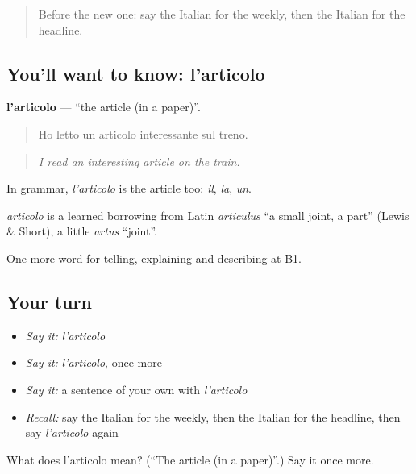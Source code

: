 \label{lesson:IT-C282-articolo}



\begin{quote}
Before the new one: say the Italian for the weekly, then the Italian for the headline.
\end{quote}

\subsection*{You'll want to know: l'articolo}
\textbf{l'articolo} — \textquotedblleft{}the article (in a paper)\textquotedblright{}.

\begin{quote}
Ho letto un articolo interessante sul treno.
\end{quote}

\begin{quote}
\emph{I read an interesting article on the train.}
\end{quote}

In grammar, \emph{l'articolo} is the article too: \emph{il}, \emph{la}, \emph{un}.

\begin{cousinweb}
\emph{articolo} is a learned borrowing from Latin \emph{articulus} \textquotedblleft{}a small joint, a part\textquotedblright{} (Lewis \& Short), a little \emph{artus} \textquotedblleft{}joint\textquotedblright{}.
\end{cousinweb}

\begin{grammarlens}[title={What you've built}]
One more word for telling, explaining and describing at B1.
\end{grammarlens}

\subsection*{Your turn}
\begin{itemize}
\raggedright
  \item \emph{Say it:} \emph{l'articolo}
  \item \emph{Say it:} \emph{l'articolo}, once more
  \item \emph{Say it:} a sentence of your own with \emph{l'articolo}
  \item \emph{Recall:} say the Italian for the weekly, then the Italian for the headline, then say \emph{l'articolo} again
\end{itemize}

\begin{tcolorbox}[breakable,colback=teal!4,colframe=teal!35!black,title={Before you move on}]
What does l'articolo mean? (\textquotedblleft{}The article (in a paper)\textquotedblright{}.) Say it once more.
\end{tcolorbox}
